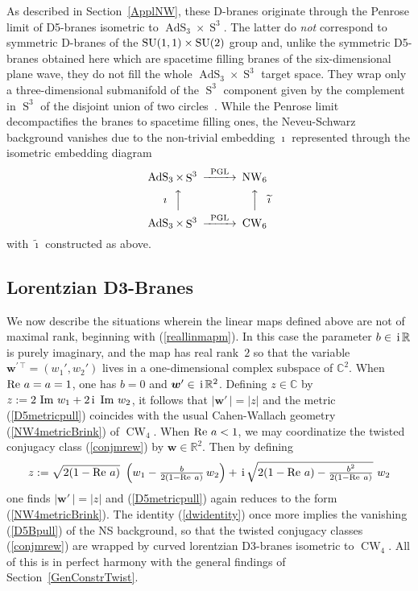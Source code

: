 \documentclass[11pt,a4paper]{article}
\DeclareMathOperator{\AdS}{AdS}
\DeclareMathOperator{\Sphere}{S}
\DeclareMathOperator{\NW}{NW}
\DeclareMathOperator{\CW}{CW}
\let\S\Sphere
\newcommand{\ii}{{\rm i}}
\newcommand{\mbf}[1]{{\boldsymbol {#1} }}
\def\ii{{\,{\rm i}\,}}
\def\mw{{\mbf w}}
\newcommand{\complex}{{\mathbb C}} %
\newcommand{\real}{{\mathbb R}} %
\newcommand{\beq}{\begin{eqnarray}}
\newcommand{\eeq}{\end{eqnarray}}
\begin{document}
As described in Section~\ref{ApplNW}, these D-branes originate through
the Penrose limit of D5-branes isometric to $\AdS_3\times\S^3$. The
latter do {\it not} correspond to symmetric D-branes of the ${\rm
  SU}(1,1)\times{\rm SU}(2)$ group and, unlike the symmetric
D5-branes obtained here which are spacetime filling branes of the
six-dimensional plane wave, they do not fill the whole
$\AdS_3\times\S^3$ target space. They wrap only a three-dimensional
submanifold of the $\S^3$ component given by the complement in $\S^3$
of the disjoint union of two circles~\cite{Stanciu3}. While the Penrose limit
decompactifies the branes to spacetime filling ones, the Neveu-Schwarz
background vanishes due to the non-trivial embedding $\imath$
represented through the isometric embedding diagram
\begin{equation}
  \label{CW6commdiag}
  \begin{CD}
    \AdS_3 \times \S^3             @>\text{PGL}>> \NW_6\\
    \text{$\imath~~$}@AAA @AAA\text{$\widetilde{\imath}$}\\
    \AdS_3 \times \S^3             @>\text{PGL}>> \CW_6\\
  \end{CD}
\end{equation}
with $\widetilde{\imath}$ constructed as above.

\subsection{Lorentzian D3-Branes\label{LorD3}}

We now describe the situations wherein the linear maps defined above
are not of maximal rank, beginning with (\ref{reallinmapm}). In this
case the parameter $b\in\ii\real$ is purely imaginary, and the map has
real rank~$2$ so that the variable $\mw^{\prime\,\top}=(w_1',w_2')$
lives in a one-dimensional complex subspace of $\complex^2$. When
${\rm Re}~a=a=1$, one has $b=0$ and $\mw'\in\ii\real^2$. Defining
$z\in\complex$ by $z:=2~{\rm Im}~w_1+2\ii~{\rm Im}~w_2$, it follows that
$|\mw'\,|=|z|$ and the metric (\ref{D5metricpull}) coincides with the
usual Cahen-Wallach geometry (\ref{NW4metricBrink}) of $\CW_4$. When
${\rm Re}~a<1$, we may coordinatize the twisted conjugacy class
(\ref{conjmrew}) by $\mw\in\real^2$. Then by defining
\beq
z:=\sqrt{2(1-{\rm Re}~a)}~\left(w_1-\mbox{$\frac b{2(1-{\rm Re}~a)}$}
\,w_2\right)+\ii\sqrt{2(1-{\rm Re}~a)-\mbox{$\frac{b^2}
{2(1-{\rm Re}~a)}$}}~w_2
\label{zD3def}\eeq
one finds $|\mw'\,|=|z|$ and (\ref{D5metricpull}) again reduces to the
form (\ref{NW4metricBrink}). The identity (\ref{dwidentity}) once more
implies the vanishing (\ref{D5Bpull}) of the NS background, so that
the twisted conjugacy classes (\ref{conjmrew}) are wrapped by
curved lorentzian D3-branes isometric to $\CW_4$. All of this is in
perfect harmony with the general findings of
Section~\ref{GenConstrTwist}.
\end{document}

